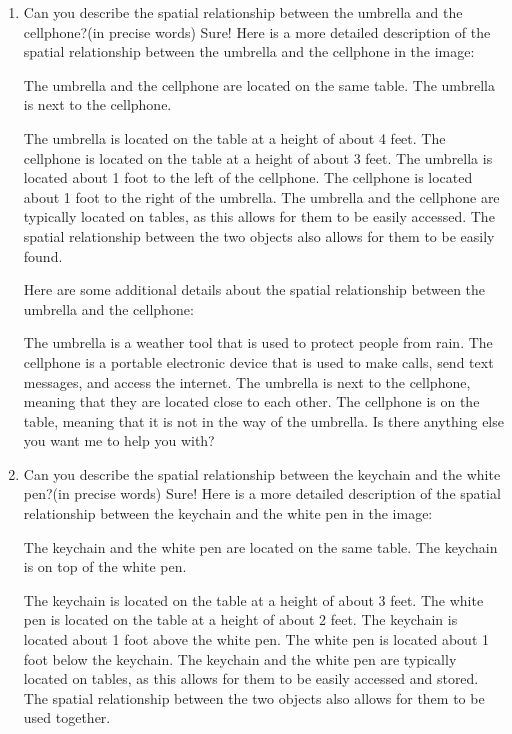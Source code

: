 \begin{enumerate}
    \item Can you describe the spatial relationship between the umbrella and the cellphone?(in precise words)
    \subitem 
    Sure! Here is a more detailed description of the spatial relationship between the umbrella and the cellphone in the image:
    
    The umbrella and the cellphone are located on the same table. The umbrella is next to the cellphone.
    
    The umbrella is located on the table at a height of about 4 feet.
    The cellphone is located on the table at a height of about 3 feet.
    The umbrella is located about 1 foot to the left of the cellphone.
    The cellphone is located about 1 foot to the right of the umbrella.
    The umbrella and the cellphone are typically located on tables, as this allows for them to be easily accessed. The spatial relationship between the two objects also allows for them to be easily found.
    
    Here are some additional details about the spatial relationship between the umbrella and the cellphone:
    
    The umbrella is a weather tool that is used to protect people from rain.
    The cellphone is a portable electronic device that is used to make calls, send text messages, and access the internet.
    The umbrella is next to the cellphone, meaning that they are located close to each other.
    The cellphone is on the table, meaning that it is not in the way of the umbrella.
    Is there anything else you want me to help you with?
    \item Can you describe the spatial relationship between the keychain and the white pen?(in precise words)
    \subitem 
    Sure! Here is a more detailed description of the spatial relationship between the keychain and the white pen in the image:
    
    The keychain and the white pen are located on the same table. The keychain is on top of the white pen.
    
    The keychain is located on the table at a height of about 3 feet.
    The white pen is located on the table at a height of about 2 feet.
    The keychain is located about 1 foot above the white pen.
    The white pen is located about 1 foot below the keychain.
    The keychain and the white pen are typically located on tables, as this allows for them to be easily accessed and stored. The spatial relationship between the two objects also allows for them to be used together.
    

\end{enumerate}
